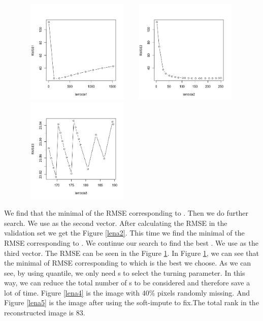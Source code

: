 \documentclass[12pt]{article}
\begin{document}
\begin{figure}
	\centering
	\begin{minipage}[c]{0.32\textwidth}
		\centering
		\includegraphics[angle=0,width=5.5cm,height=5cm]{lena1}
		\caption{}\label{lena1}
	\end{minipage}
	\begin{minipage}[c]{0.32\textwidth}
		\centering
		\includegraphics[angle=0,width=5.5cm,height=5cm]{lena2}
		\caption{}\label{lena2}
	\end{minipage}
	\begin{minipage}[c]{0.32\textwidth}
		\centering
		\includegraphics[angle=0,width=5.5cm,height=5cm]{lena3}
		\caption{}\label{lena3}
	\end{minipage}
\end{figure}

We find that the minimal of the RMSE corresponding to . Then we do further search. We use  as the second  vector. After calculating the RMSE in the validation set we get the Figure \ref{lena2}. This time we find the minimal of the RMSE corresponding to . We continue our search to find the best . We use  as the third  vector. The RMSE can be seen in the Figure \ref{lena3}. In Figure \ref{lena3}, we can see that the minimal of RMSE corresponding to   which is the best  we choose.
As we can see, by using quantile, we only need  s to select the turning parameter. In this way, we can reduce the total number of s to be considered and therefore save a lot of time.
Figure \ref{lena4} is the image with 40\% pixels randomly missing. And Figure \ref{lena5} is the image after using the soft-impute to fix.The total rank in the reconstructed image is 83.
\end{document}
